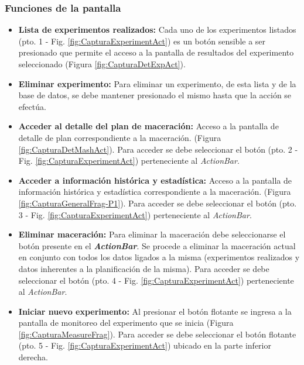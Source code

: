             \subsubsection{Funciones de la pantalla}
                \begin{itemize}
                    \item \textbf{Lista de experimentos realizados:} Cada uno de los experimentos listados (pto. 1 - Fig. \ref{fig:CapturaExperimentAct}) es un botón sensible a ser presionado que permite el acceso a la pantalla de resultados del experimento seleccionado (Figura \ref{fig:CapturaDetExpAct}).
             
                    \item \textbf{Eliminar experimento:} Para eliminar un experimento, de esta lista y de la base de datos, se debe mantener presionado el mismo hasta que la acción se efectúa. 
           
                    \item \textbf{Acceder al detalle del plan de maceración:} Acceso a la pantalla de detalle de plan correspondiente a la maceración. (Figura \ref{fig:CapturaDetMashAct}). Para acceder se debe seleccionar el botón (pto. 2 - Fig. \ref{fig:CapturaExperimentAct}) perteneciente al \textit{ActionBar}.
                    
                    \item \textbf{Acceder a información histórica y estadística:} Acceso a la pantalla de información histórica y estadística correspondiente a la maceración. (Figura \ref{fig:CapturaGeneralFrag-P1}). Para acceder se debe seleccionar el botón (pto. 3 - Fig. \ref{fig:CapturaExperimentAct}) perteneciente al \textit{ActionBar}.
                    
                    \item \textbf{Eliminar maceración:} Para eliminar la maceración debe seleccionarse el botón presente en el \textbf{\textit{\gls{ActionBar}}}. Se procede a eliminar la maceración actual en conjunto con todos los datos ligados a la misma (experimentos realizados y datos inherentes a la planificación de la misma). Para acceder se debe seleccionar el botón (pto. 4 - Fig. \ref{fig:CapturaExperimentAct}) perteneciente al \textit{ActionBar}.
                    
                    \item \textbf{Iniciar nuevo experimento:} Al presionar el botón flotante se ingresa a la pantalla de monitoreo del experimento que se inicia (Figura \ref{fig:CapturaMeasureFrag}). Para acceder se debe seleccionar el botón flotante (pto. 5 - Fig. \ref{fig:CapturaExperimentAct}) ubicado en la parte inferior derecha.
                    
                \end{itemize}
                
